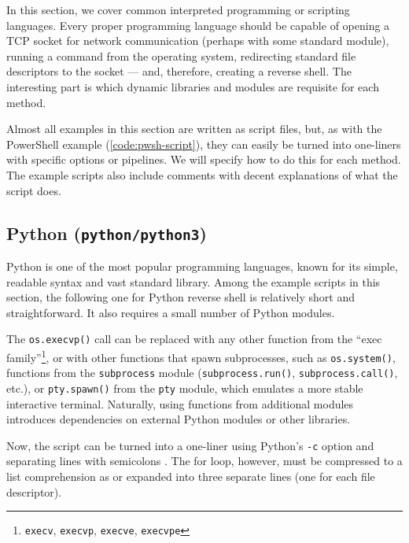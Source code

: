 In this section, we cover common interpreted programming or scripting languages. Every proper programming language should be capable of opening a TCP socket for network communication (perhaps with some standard module), running a command from the operating system, redirecting standard file descriptors to the socket — and, therefore, creating a reverse shell. The interesting part is which dynamic libraries and modules are requisite for each method.

Almost all examples in this section are written as script files, but, as with the PowerShell example (\cref{code:pwsh-script}), they can easily be turned into one-liners with specific options or pipelines. We will specify how to do this for each method. The example scripts also include comments with decent explanations of what the script does.


\subsection{Python (\texttt{python/python3})}


Python is one of the most popular programming languages, known for its simple, readable syntax and vast standard library. Among the example scripts in this section, the following one for Python reverse shell is relatively short and straightforward. It also requires a small number of Python modules.


The \texttt{os.execvp()} call can be replaced with any other function from the ``exec family''\footnote{\texttt{execv}, \texttt{execvp}, \texttt{execve}, \texttt{execvpe}}, or with other functions that spawn subprocesses, such as \texttt{os.system()}, functions from the \texttt{subprocess} module (\texttt{subprocess.run()}, \texttt{subprocess.call()}, etc.), or \texttt{pty.spawn()} from the \texttt{pty} module, which emulates a more stable interactive terminal. Naturally, using functions from additional modules introduces dependencies on external Python modules or other libraries.


Now, the script can be turned into a one-liner using Python's \texttt{-c} option and separating lines with semicolons \cite{python-man}. The for loop, however, must be compressed to a list comprehension as  or expanded into three separate lines (one for each file descriptor).

